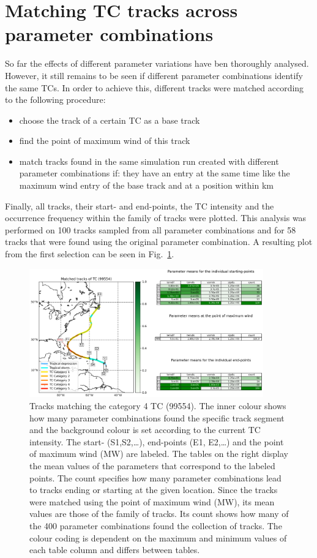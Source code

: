 \section{Matching TC tracks across parameter combinations}
So far the effects of different parameter variations have ben thoroughly analysed. However, it still remains to be seen if different parameter combinations identify the same TCs. In order to achieve this, different tracks were matched according to the following procedure:
\begin{itemize}
  \item choose the track of a certain TC as a base track
  \item find the point of maximum wind of this track
  \item match tracks found in the same simulation run created with different parameter combinations if: they have an entry at the same time like the maximum wind entry of the base track and at a position within \unit[70]{km}
\end{itemize}
Finally, all tracks, their start- and end-points, the TC intensity and the occurrence frequency within the family of tracks were plotted. This analysis was performed on 100 tracks sampled from all parameter combinations and for 58 tracks that were found using the original parameter combination. A resulting plot from the first selection can be seen in Fig.~\ref{fig:matching_plot_cat4}.\newline
\begin{figure}[!htb]
	\centering
	\includegraphics[width=0.9\textwidth]{img/matching_plot_ref_02_tc99554_param_id353_cat4.png}
	\caption{Tracks matching the category 4 TC (99554). The inner colour shows how many parameter combinations found the specific track segment and the background colour is set according to the current TC intensity. The start- (S1,S2,\dots), end-points (E1, E2,\dots) and the point of maximum wind (MW) are labeled.  \newline
	The tables on the right display the mean values of the parameters that correspond to the labeled points. The count specifies how many parameter combinations lead to tracks ending or starting at the given location. Since the tracks were matched using the point of maximum wind (MW), its mean values are those of the family of tracks. Its count shows how many of the 400 parameter combinations found the collection of tracks. The colour coding is dependent on the maximum and minimum values of each table column and differs between tables.}
	\label{fig:matching_plot_cat4}
\end{figure}
